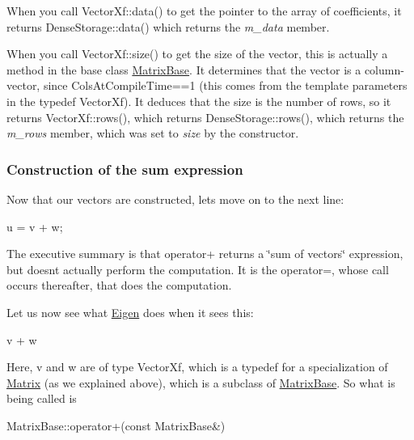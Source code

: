 When you call Vector\+Xf\+::data() to get the pointer to the array of coefficients, it returns Dense\+Storage\+::data() which returns the {\itshape m\+\_\+data} member.

When you call Vector\+Xf\+::size() to get the size of the vector, this is actually a method in the base class \hyperlink{group___core___module_class_eigen_1_1_matrix_base}{Matrix\+Base}. It determines that the vector is a column-\/vector, since Cols\+At\+Compile\+Time==1 (this comes from the template parameters in the typedef Vector\+Xf). It deduces that the size is the number of rows, so it returns Vector\+Xf\+::rows(), which returns Dense\+Storage\+::rows(), which returns the {\itshape m\+\_\+rows} member, which was set to {\itshape size} by the constructor.\hypertarget{_topic_inside_eigen_example_ConstructionOfSumXpr}{}\subsubsection{Construction of the sum expression}\label{_topic_inside_eigen_example_ConstructionOfSumXpr}
Now that our vectors are constructed, let\textquotesingle{}s move on to the next line\+:


\begin{DoxyCode}
u = v + w;
\end{DoxyCode}


The executive summary is that operator+ returns a \char`\"{}sum of vectors\char`\"{} expression, but doesn\textquotesingle{}t actually perform the computation. It is the operator=, whose call occurs thereafter, that does the computation.

Let us now see what \hyperlink{namespace_eigen}{Eigen} does when it sees this\+:


\begin{DoxyCode}
v + w
\end{DoxyCode}


Here, v and w are of type Vector\+Xf, which is a typedef for a specialization of \hyperlink{group___core___module_class_eigen_1_1_matrix}{Matrix} (as we explained above), which is a subclass of \hyperlink{group___core___module_class_eigen_1_1_matrix_base}{Matrix\+Base}. So what is being called is


\begin{DoxyCode}
MatrixBase::operator+(\textcolor{keyword}{const} MatrixBase&)
\end{DoxyCode}


